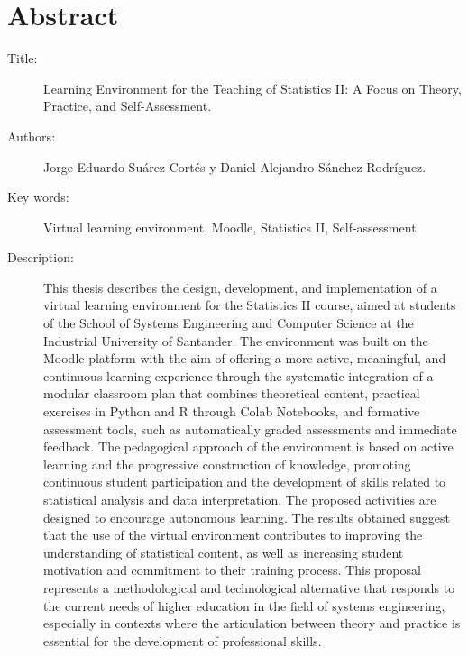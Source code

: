 \documentclass[letter,oneside,12pt,spanish]{report}
\begin{document}
\newpage

\chapter*{Abstract}

\footnotesize{
\begin{description}
  \item[Title:] Learning Environment for the Teaching of Statistics II: A Focus on Theory, Practice, and Self-Assessment.
  \item[Authors:] Jorge Eduardo Suárez Cortés y Daniel Alejandro Sánchez Rodríguez.
  \item[Key words:] Virtual learning environment, Moodle, Statistics II, Self-assessment.
  \item[Description:]This thesis describes the design, development, and implementation of a virtual learning environment for the Statistics II course, aimed at students of the School of Systems Engineering and Computer Science at the Industrial University of Santander. The environment was built on the Moodle platform with the aim of offering a more active, meaningful, and continuous learning experience through the systematic integration of a modular classroom plan that combines theoretical content, practical exercises in Python and R through Colab Notebooks, and formative assessment tools, such as automatically graded assessments and immediate feedback.
  The pedagogical approach of the environment is based on active learning and the progressive construction of knowledge, promoting continuous student participation and the development of skills related to statistical analysis and data interpretation. The proposed activities are designed to encourage autonomous learning. The results obtained suggest that the use of the virtual environment contributes to improving the understanding of statistical content, as well as increasing student motivation and commitment to their training process. This proposal represents a methodological and technological alternative that responds to the current needs of higher education in the field of systems engineering, especially in contexts where the articulation between theory and practice is essential for the development of professional skills.


\end{description}}\normalsize
\end{document}
